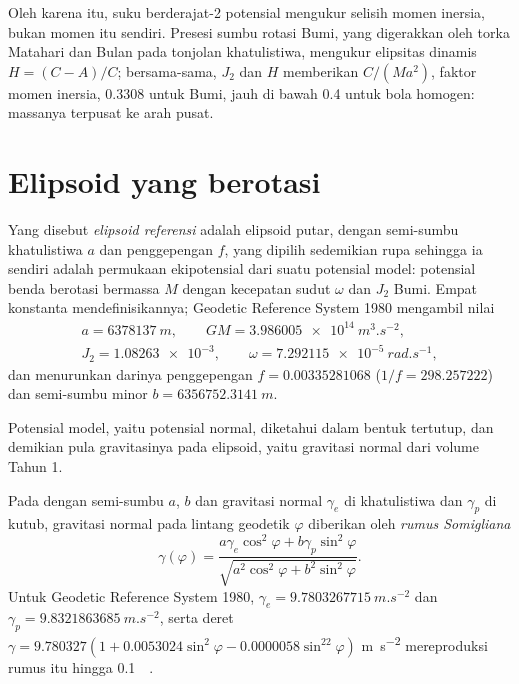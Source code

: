 Oleh karena itu, suku berderajat-2 potensial mengukur selisih
momen inersia, bukan momen itu sendiri. Presesi sumbu rotasi Bumi,
yang digerakkan oleh torka Matahari dan Bulan pada tonjolan khatulistiwa,
mengukur elipsitas dinamis $H = (C - A)/C$; bersama-sama, $J_2$ dan $H$ memberikan
$C/(Ma^2)$, faktor momen inersia, \num{0.3308} untuk Bumi,
jauh di bawah \num{0.4} untuk bola homogen: massanya terpusat ke arah
pusat.

\section{Elipsoid yang berotasi}

\begin{definition}\label{def:b3:gravity-geodesy:ellipsoid}
Yang disebut \emph{elipsoid referensi} adalah elipsoid
putar, dengan semi-sumbu khatulistiwa $a$ dan penggepengan $f$, yang dipilih sedemikian rupa sehingga ia
sendiri adalah permukaan ekipotensial dari suatu potensial model: potensial benda berotasi
bermassa $M$ dengan kecepatan sudut $\omega$ dan 
$J_2$ Bumi. Empat konstanta mendefinisikannya; Geodetic Reference
System 1980 mengambil nilai
\begin{gather*}
  a = \qty{6378137}{m},\qquad GM = \qty{3.986005e14}{m^3.s^{-2}},\\
  J_2 = \num{1.08263e-3},\qquad \omega = \qty{7.292115e-5}{rad.s^{-1}},
\end{gather*}
dan menurunkan darinya penggepengan $f = \num{0.00335281068}$
($1/f = \num{298.257222}$) dan semi-sumbu minor
$b = \qty{6356752.3141}{m}$.
\end{definition}

Potensial model, yaitu potensial normal, diketahui dalam bentuk tertutup, dan
demikian pula gravitasinya pada elipsoid, yaitu gravitasi normal dari volume Tahun 1.

\begin{proposition}\label{prop:b3:gravity-geodesy:somigliana}
Pada  dengan semi-sumbu $a$, $b$ dan gravitasi normal
$\gamma_e$ di khatulistiwa dan $\gamma_p$ di kutub, gravitasi normal pada
lintang geodetik $\varphi$ diberikan oleh \emph{rumus
Somigliana}
\[
  \gamma(\varphi) = \frac{a\gamma_e\cos^2\varphi + b\gamma_p\sin^2\varphi}
  {\sqrt{a^2\cos^2\varphi + b^2\sin^2\varphi}} .
\]
Untuk Geodetic Reference System 1980, $\gamma_e = \qty{9.7803267715}{m.s^{-2}}$
dan $\gamma_p = \qty{9.8321863685}{m.s^{-2}}$, serta deret
$\gamma = 9.780327(1 + 0.0053024\sin^2\varphi - 0.0000058\sin^22\varphi)$
\unit{m.s^{-2}} mereproduksi rumus itu hingga \qty{0.1}{\milli\gal}.
\end{proposition}
\admitted

